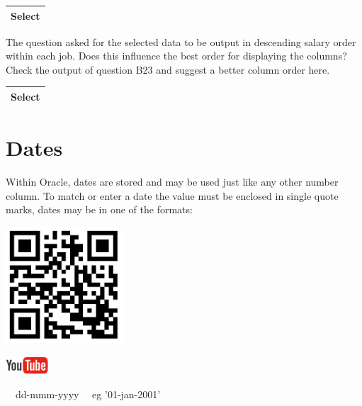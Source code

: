 \begin{flushleft}
\tablefirsthead{}
\tablehead{}
\tabletail{}
\tablelasttail{}
\begin{supertabular}{|m{14.303cm}|}
\hline
Select 

\\\hline
\end{supertabular}
\end{flushleft}
The question asked for the selected data to be output in descending salary order within each job.  Does this influence the best order for displaying the columns?  Check the output of question B23 and suggest a better column order here.

\begin{flushleft}
\tablefirsthead{}
\tablehead{}
\tabletail{}
\tablelasttail{}
\begin{supertabular}{|m{14.303cm}|}
\hline
Select 

\\\hline
\end{supertabular}
\end{flushleft}

\section{Dates}
Within Oracle, dates are stored and may be used just like any other number column.  To match or enter a date the value must be enclosed in single quote marks, dates may be in one of the formats:

\begin{center}
\begin{minipage}{4.849cm}
   
\includegraphics[width=4.341cm,height=4.341cm]{images/img (30).png}
 

   
\includegraphics[width=1.582cm,height=0.674cm]{images/img (15).png}
 
\end{minipage}
\end{center}
\ \ dd-mmm-yyyy  \ \ eg  {}'01-jan-2001'

